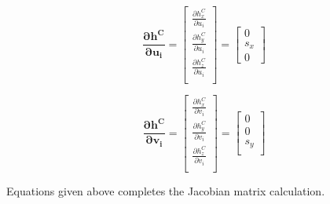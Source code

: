 \begin{equation}
\boldsymbol{\frac{\partial h^{C}}{\partial u_{i}}}=\begin{bmatrix}
\frac{\partial h_{x}^{C}}{\partial u_{i}} \\
\frac{\partial h_{y}^{C}}{\partial u_{i}} \\
\frac{\partial h_{z}^{C}}{\partial u_{i}} \\
\end{bmatrix}= \begin{bmatrix}
0 \\
s_{x}\\
0
\end{bmatrix}
\end{equation}

\begin{equation}
\label{eq:par_h_v}
\boldsymbol{\frac{\partial h^{C}}{\partial v_{i}}}=\begin{bmatrix}
\frac{\partial h_{x}^{C}}{\partial v_{i}}\\
\frac{\partial h_{y}^{C}}{\partial v_{i}}\\
\frac{\partial h_{z}^{C}}{\partial v_{i}}\\
\end{bmatrix}= \begin{bmatrix}
0 \\
0 \\
s_{y}\\
\end{bmatrix}
\end{equation}

\noindent Equations given above completes the Jacobian matrix calculation.

